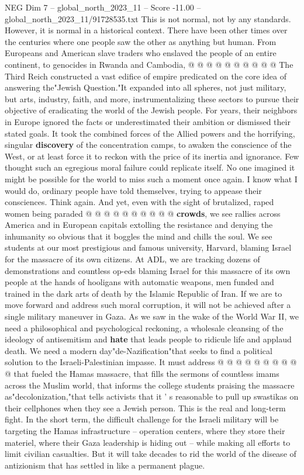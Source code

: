 \begin{textsample}{NEG Dim 7 – global\_north\_2023\_11 – Score -11.00 – global\_north\_2023\_11/91728535.txt}
This is not normal, not by any standards.
However, it is normal in a historical context.
There have been other times over the centuries where one people saw the other as anything but human.
From Europeans and American slave traders who enslaved the people of an entire continent, to genocides in Rwanda and Cambodia, @ @ @ @ @ @ @ @ @ @ The Third Reich constructed a vast edifice of empire predicated on the core idea of answering the"Jewish Question."It expanded into all spheres, not just military, but arts, industry, faith, and more, instrumentalizing these sectors to pursue their objective of eradicating the world of the Jewish people.
For years, their neighbors in Europe ignored the facts or underestimated their ambition or dismissed their stated goals.
It took the combined forces of the Allied powers and the horrifying, singular \textbf{discovery} of the concentration camps, to awaken the conscience of the West, or at least force it to reckon with the price of its inertia and ignorance.
Few thought such an egregious moral failure could replicate itself.
No one imagined it might be possible for the world to miss such a moment once again.
I know what I would do, ordinary people have told themselves, trying to appease their consciences.
Think again.
And yet, even with the sight of brutalized, raped women being paraded @ @ @ @ @ @ @ @ @ @ \textbf{crowds}, we see rallies across America and in European capitals extolling the resistance and denying the inhumanity so obvious that it boggles the mind and chills the soul.
We see students at our most prestigious and famous university, Harvard, blaming Israel for the massacre of its own citizens.
At ADL, we are tracking dozens of demonstrations and countless op-eds blaming Israel for this massacre of its own people at the hands of hooligans with automatic weapons, men funded and trained in the dark arts of death by the Islamic Republic of Iran.
If we are to move forward and address such moral corruption, it will not be achieved after a single military maneuver in Gaza.
As we saw in the wake of the World War II, we need a philosophical and psychological reckoning, a wholesale cleansing of the ideology of antisemitism and \textbf{hate} that leads people to ridicule life and applaud death.
We need a modern day"de-Nazification"that seeks to find a political solution to the Israeli-Palestinian impasse.
It must address @ @ @ @ @ @ @ @ @ @ that fueled the Hamas massacre, that fills the sermons of countless imams across the Muslim world, that informs the college students praising the massacre as"decolonization,"that tells activists that it ' s reasonable to pull up swastikas on their cellphones when they see a Jewish person.
This is the real and long-term fight.
In the short term, the difficult challenge for the Israeli military will be targeting the Hamas infrastructure -- operation centers, where they store their materiel, where their Gaza leadership is hiding out -- while making all efforts to limit civilian casualties.
But it will take decades to rid the world of the disease of antizionism that has settled in like a permanent plague.


\end{textsample}
